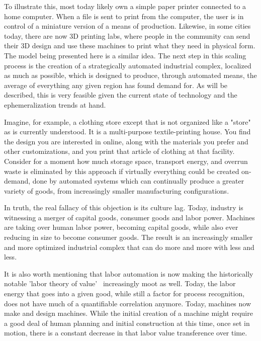 \documentclass[10pt, a4paper, cleardoubleempty, openright, twoside]{book}
\begin{document}
To illustrate this, most today likely own a simple paper printer
connected to a home computer. When a file is sent to print from the
computer, the user is in control of a miniature version of a means of
production. Likewise, in some cities today, there are now 3D printing
labs, where people in the community can send their 3D design and use
these machines to print what they need in physical form. The model being
presented here is a similar idea. The next step in this scaling process
is the creation of a strategically automated industrial complex,
localized as much as possible, which is designed to produce, through
automated means, the average of everything any given region has found
demand for. As will be described, this is very feasible given the
current state of technology and the ephemeralization trends at hand.

Imagine, for example, a clothing store except that is not organized like a "store" as is currently understood. It is a multi-purpose textile-printing house. You find the design you are interested in online, along with the materials you prefer and other customizations, and you print that article of clothing  at that facility. Consider for a moment how much storage space, transport energy, and overrun waste is eliminated by this approach if virtually everything could be created on-demand, done by automated systems which can continually produce a greater variety of goods, from increasingly smaller manufacturing configurations.

In truth, the real fallacy of this  objection is its culture lag. Today, industry is
witnessing a merger of capital goods, consumer goods and labor power.
Machines are taking over human labor power, becoming capital goods,
while also ever reducing in size to become consumer goods. The result is
an increasingly smaller and more optimized industrial complex that can
do more and more with less and less.

It is also worth mentioning that labor automation is now making the
historically notable 'labor theory of
value'~\cite{Investopedia:http:14b} increasingly moot as well. Today,
the labor energy that goes into a given good, while still a factor for
process recognition, does not have much of a quantifiable correlation
anymore. Today, machines now make and design machines. While the initial
creation of a machine might require a good deal of human planning and
initial construction at this time, once set in motion, there is a
constant decrease in that labor value transference over time.
\end{document}

